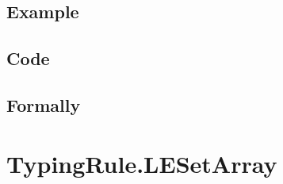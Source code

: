 \documentclass{book}
\begin{document}
  \subsection{Example}

  \subsection{Code}

\begin{emptyformal}
    \subsection{Formally}
\end{emptyformal}


\section{TypingRule.LESetArray \label{sec:TypingRule.LESetArray}}
\end{document}
